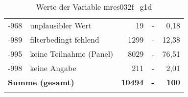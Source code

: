 \begin{longtable}{Xlrrr}
       -968 & unplausibler Wert & 19 & - & 0,18 \\

       -989 & filterbedingt fehlend & 1299 & - & 12,38 \\

       -995 & keine Teilnahme (Panel) & 8029 & - & 76,51 \\

       -998 & keine Angabe & 211 & - & 2,01 \\

     \midrule
     \multicolumn{2}{l}{\textbf{Summe (gesamt)}} & \textbf{10494} & \textbf{-} & \textbf{100} \\
     \bottomrule
     \caption{Werte der Variable mres032f\_g1d}
     \end{longtable}
     
